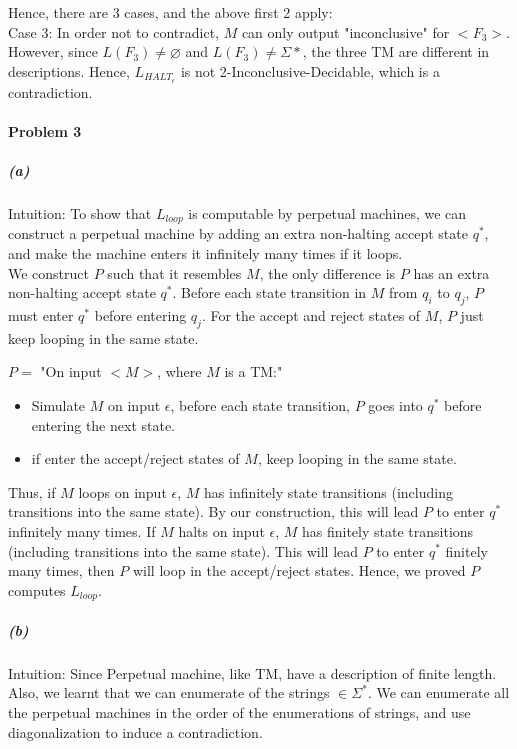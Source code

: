 \documentclass[11pt]{article}
\begin{document}
Hence, there are 3 cases, and the above first 2 apply: \\

Case 3: In order not to contradict, $M$ can only output "inconclusive" for $<F_3>$. However, since $L(F_3) \neq \varnothing$ and $L(F_3) \neq \Sigma*$, the three TM are different in descriptions. Hence, $L_{{HALT}_{\epsilon}}$ is not 2-Inconclusive-Decidable, which is a contradiction.
\newpage

\paragraph{Problem 3}
\subparagraph{(a)}
Intuition: To show that $L_{loop}$ is computable by perpetual machines, we can construct a perpetual machine by adding an extra non-halting accept state $q^*$, and make the machine enters it infinitely many times if it loops.\\

We construct $P$ such that it resembles $M$, the only difference is $P$ has an extra non-halting accept state $q^*$. Before each state transition in $M$ from $q_i$ to $q_j$, $P$ must enter $q^*$ before entering $q_j$. For the accept and reject states of $M$, $P$ just keep looping in the same state.

$P=$ "On input $<M>$, where $M$ is a TM:"
\begin{itemize}
\item Simulate $M$ on input $\epsilon$, before each state transition, $P$ goes into $q^*$ before entering the next state.
\item if enter the accept/reject states of $M$, keep looping in the same state.
\end{itemize}

Thus, if $M$ loops on input $\epsilon$, $M$ has infinitely state transitions (including transitions into the same state). By our construction, this will lead $P$ to enter $q^*$ infinitely many times. If $M$ halts on input $\epsilon$, $M$ has finitely state transitions (including transitions into the same state). This will lead $P$ to enter $q^*$ finitely many times, then $P$ will loop in the accept/reject states. Hence, we proved $P$ computes $L_{loop}$.

\subparagraph{(b)}
Intuition: Since Perpetual machine, like TM, have a description of finite length. Also, we learnt that we can enumerate of the strings $\in \Sigma^*$. We can enumerate all the perpetual machines in the order of the enumerations of strings, and use diagonalization to induce a contradiction. \\
\end{document}
